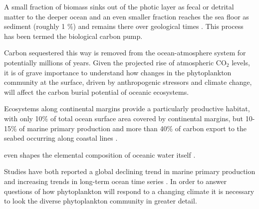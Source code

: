 A small fraction of biomass sinks out of the photic layer as fecal or detrital matter to the deeper ocean and an even smaller fraction reaches the sea floor as sediment (roughly 1 \%) and remains there over geological times \citep{Honjo2008}. This process has been termed the biological carbon pump. 



Carbon sequestered this way is removed from the ocean-atmosphere system for potentially millions of years. Given the projected rise of atmospheric CO$_2$ levels, it is of grave importance to understand how changes in the phytoplankton community at the surface, driven by anthropogenic stressors and climate change, will affect the carbon burial potential of oceanic ecosystems. 

Ecosystems along continental margins provide a particularly productive habitat, with only 10\% of total ocean surface area covered by continental margins, but 10-15\% of marine primary production and more than 40\% of carbon export to the seabed occurring along coastal lines \citep{Yool2001,Muller-Karger2005}. 


even shapes the elemental composition of oceanic water itself \citep{Redfield1958}. 


Studies have both reported a global declining trend in marine primary production \citep{Boyce2012} and increasing trends %
in long-term ocean time series \citep{Chavez2011a}.
In order to answer questions of how phytoplankton will respond to a changing climate it is necessary to look the diverse phytoplankton community in greater detail. 

